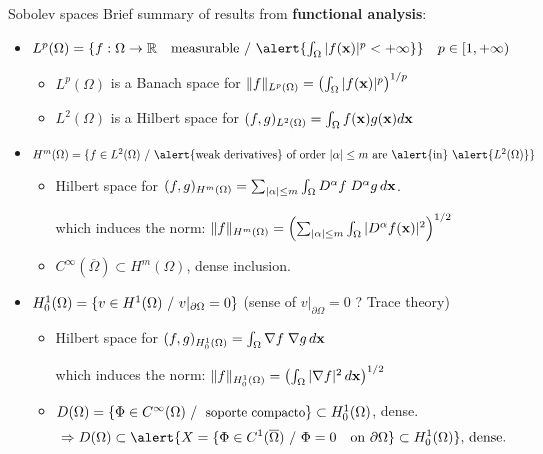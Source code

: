 \begin{frame}{Sobolev spaces}
  \small
  {\color{PHDgray} Brief summary of results from \textbf{functional analysis}:}
  \begin{itemize}
  \setlength\itemsep{0.5em}
  \item<1->
    $L^p(\Omega)=\{ f: \Omega \to \Rset \quad \text{measurable} \st
    \alert{\int_\Omega |f(\xx)|^p < +\infty} \} \quad p \in [1,+\infty)$
    \begin{itemize}
      \setlength\itemsep{0.3em}
      \scriptsize
    \item $L^p(\Omega)$ is a Banach space for
      $\norm[L^p(\Omega)]{f}=\left(\int_\Omega|f(\xx)|^p\right)^{1/p}$
    \item $L^2(\Omega)$ is a Hilbert space for $(f,g)_{L^2(\Omega)}=\int_\Omega f(\xx) g(\xx) d\xx$
    \end{itemize}

  \item<2->
    $ H^m(\Omega) = \{ f\in L^2(\Omega) \st \text{\alert{weak derivatives} of
      order $|\alpha| \le m$ are \alert{in} } \alert{L^2(\Omega)} \} $
    \begin{itemize}
      \setlength\itemsep{0.3em}
      \scriptsize
    \item Hilbert space for
      $(f,g)_{H^m(\Omega)}=\sum_{|\alpha|\le m} \int_\Omega D^\alpha f
      \; D^\alpha g \,d\xx$.
      \par {\color{PHDgray} which induces the norm:} \quad
      $\norm[H^m(\Omega)]{f}=\left(\sum_{|\alpha|\le m} \int_\Omega|D^\alpha f(\xx)|^2\right)^{1/2}$
      \item $C^\infty(\overline\Omega) \subset H^m(\Omega)$, dense inclusion.
    \end{itemize}

  \item<3-> \alert{$H_0^1(\Omega) = \{ v \in H^1(\Omega) \st v|_{\partial\Omega}=0 \}$}
     \hfill{\color{PHDgray} (sense of $v|_{\partial\Omega}=0$ ? Trace theory)}
    \begin{itemize}
      \setlength\itemsep{0.3em}
      \scriptsize
    \item Hilbert space for
      $(f,g)_{H_0^1(\Omega)}=\int_\Omega \grad f \; \grad g \, d\xx $
      \par {\color{PHDgray} which induces the norm:} \quad
      $\norm[H_0^1(\Omega)]{f}=\left(\int_\Omega|\grad f|^2\, d\xx\right)^{1/2}$
    \item $D(\Omega) =\{ \small \Phi\in C^\infty(\Omega) \st \text{ soporte compacto} \}
      \subset H_0^1(\Omega)$, dense.
       \small
     $$\Rightarrow
      D(\Omega) \subset \alert{X=\{ \Phi\in C^1(\overline\Omega) \st \Phi=0 \quad \mbox{on
      } \partial\Omega\} \subset H_0^1(\Omega)} \text{, dense}.$$
    \end{itemize}
  \end{itemize}
\end{frame}

